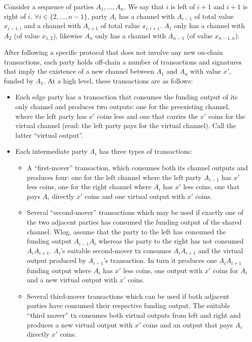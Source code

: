 Consider a sequence of parties $A_1, \dots, A_n$. We say that $i$ is left of
$i+1$ and $i+1$ is right of $i$. $\forall i \in \{2, \dots, n-1\}$, party $A_i$
has a channel with $A_{i-1}$ of total value $x_{i-1, i}$ and a channel with
$A_{i+1}$ of total value $x_{i, i+1}$. $A_1$ only has a channel with $A_2$ (of
value $x_{1, 2}$), likewise $A_n$ only has a channel with $A_{n-1}$ (of value
$x_{n-1, n}$).

After following a specific protocol that does not involve any new on-chain
transactions, each party holds off-chain a number of transactions and signatures
that imply the existence of a new channel between $A_1$ and $A_n$ with value
$x'$, funded by $A_1$. At a high level, these transactions are as follows:
\begin{itemize}
  \item Each edge party has a transaction that consumes the funding output of
  its only channel and produces two outputs: one for the preexisting channel,
  where the left party has $x'$ coins less and one that carries the $x'$ coins
  for the virtual channel (read: the left party pays for the virtual channel).
  Call the latter ``virtual output''.
  \item Each intermediate party $A_i$ has three types of transactions:
  \begin{itemize}
    \item A ``first-mover'' transaction, which consumes both its channel outputs
    and produces four: one for the left channel where the left party $A_{i-1}$
    has $x'$ less coins, one for the right channel where $A_i$ has $x'$ less
    coins, one that pays $A_i$ directly $x'$ coins and one virtual output with
    $x'$ coins.
    \item Several ``second-mover'' transactions which may be used if exactly one
    of the two adjacent parties has consumed the funding output of the shared
    channel. Wlog, assume that the party to the left has consumed the funding
    output $A_{i-1} A_i$ whereas the party to the right has not consumed $A_i
    A_{i+1}$. $A_i$'s suitable second-mover tx consumes $A_i A_{i+1}$ and
    the virtual output produced by $A_{i-1}$'s transaction. In turn it produces
    one $A_i A_{i+1}$ funding output where $A_i$ has $x'$ less coins, one output
    with $x'$ coins for $A_i$ and a new virtual output with $x'$ coins.
    \item Several third-mover transactions which can be used if both
    adjacent parties have consumed their respective funding output. The suitable
    ``third mover'' tx consumes both virtual outputs from left and right and
    produces a new virtual output with $x'$ coins and an output that pays $A_i$
    directly $x'$ coins.
  \end{itemize}
\end{itemize}

